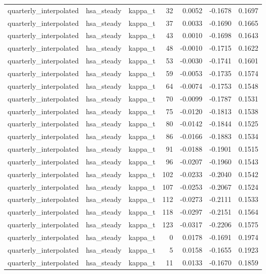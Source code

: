 \begin{tabular}{lllrrrr}
quarterly\_interpolated & hsa\_steady & kappa\_t & 32 & 0.0052 & -0.1678 & 0.1697 \\
quarterly\_interpolated & hsa\_steady & kappa\_t & 37 & 0.0033 & -0.1690 & 0.1665 \\
quarterly\_interpolated & hsa\_steady & kappa\_t & 43 & 0.0010 & -0.1698 & 0.1643 \\
quarterly\_interpolated & hsa\_steady & kappa\_t & 48 & -0.0010 & -0.1715 & 0.1622 \\
quarterly\_interpolated & hsa\_steady & kappa\_t & 53 & -0.0030 & -0.1741 & 0.1601 \\
quarterly\_interpolated & hsa\_steady & kappa\_t & 59 & -0.0053 & -0.1735 & 0.1574 \\
quarterly\_interpolated & hsa\_steady & kappa\_t & 64 & -0.0074 & -0.1753 & 0.1548 \\
quarterly\_interpolated & hsa\_steady & kappa\_t & 70 & -0.0099 & -0.1787 & 0.1531 \\
quarterly\_interpolated & hsa\_steady & kappa\_t & 75 & -0.0120 & -0.1813 & 0.1538 \\
quarterly\_interpolated & hsa\_steady & kappa\_t & 80 & -0.0142 & -0.1844 & 0.1525 \\
quarterly\_interpolated & hsa\_steady & kappa\_t & 86 & -0.0166 & -0.1883 & 0.1534 \\
quarterly\_interpolated & hsa\_steady & kappa\_t & 91 & -0.0188 & -0.1901 & 0.1515 \\
quarterly\_interpolated & hsa\_steady & kappa\_t & 96 & -0.0207 & -0.1960 & 0.1543 \\
quarterly\_interpolated & hsa\_steady & kappa\_t & 102 & -0.0233 & -0.2040 & 0.1542 \\
quarterly\_interpolated & hsa\_steady & kappa\_t & 107 & -0.0253 & -0.2067 & 0.1524 \\
quarterly\_interpolated & hsa\_steady & kappa\_t & 112 & -0.0273 & -0.2111 & 0.1533 \\
quarterly\_interpolated & hsa\_steady & kappa\_t & 118 & -0.0297 & -0.2151 & 0.1564 \\
quarterly\_interpolated & hsa\_steady & kappa\_t & 123 & -0.0317 & -0.2206 & 0.1575 \\
quarterly\_interpolated & hsa\_steady & kappa\_t & 0 & 0.0178 & -0.1691 & 0.1974 \\
quarterly\_interpolated & hsa\_steady & kappa\_t & 5 & 0.0158 & -0.1655 & 0.1923 \\
quarterly\_interpolated & hsa\_steady & kappa\_t & 11 & 0.0133 & -0.1670 & 0.1859 \\

\end{tabular}
